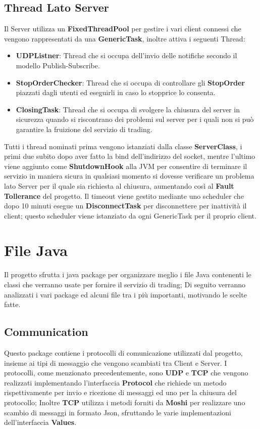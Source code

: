 \documentclass{article}
\begin{document}
\subsection{Thread Lato Server}
Il Server utilizza un \textbf{FixedThreadPool} per gestire i vari client connessi che vengono rappresentati da una \textbf{GenericTask}, inoltre attiva i seguenti Thread:
\begin{itemize}
  \item \textbf{UDPListner}: Thread che si occupa dell'invio delle notifiche secondo il modello Publish-Subscribe.
  \item \textbf{StopOrderChecker}: Thread che si occupa di controllare gli \textbf{StopOrder} piazzati dagli utenti ed eseguirli in caso lo stopprice lo consenta.
  \item \textbf{ClosingTask}: Thread che si occupa di svolgere la chiusura del server in sicurezza quando si riscontrano dei problemi sul server per i quali non si può garantire la fruizione del servizio di trading. 
\end{itemize}
Tutti i thread nominati prima vengono istanziati dalla classe \textbf{ServerClass}, i primi due subito dopo aver fatto la bind dell'indirizzo del socket, mentre l'ultimo viene aggiunto come \textbf{ShutdownHook} alla JVM per consentire di terminare il servizio in maniera sicura in qualsiasi momento si dovesse verificare un problema lato Server per il quale sia richiesta al chiusura, aumentando così al \textbf{Fault Tollerance} del progetto. 
Il timeout viene gestito mediante uno scheduler che dopo 10 minuti esegue un \textbf{DisconnectTask} per disconnettere per inattività il client; questo scheduler viene istanziato da ogni GenericTask per il proprio client.
\newpage

\section{File Java}
Il progetto sfrutta i java package per organizzare meglio i file Java contenenti le classi che verranno usate per fornire il servizio di trading; Di seguito verranno analizzati i vari package ed alcuni file tra i più importanti, motivando le scelte fatte.
\subsection{Communication}
Questo package contiene i protocolli di comunicazione utilizzati dal progetto, insieme ai tipi di messaggio che vengono scambiati tra Client e Server.
I protocolli, come menzionato precedentemente, sono \textbf{UDP} e \textbf{TCP} che vengono realizzati implementando l'interfaccia \textbf{Protocol} che richiede un metodo rispettivamente per invio e ricezione di messaggi ed uno per la chiusura del protocollo;
Inoltre \textbf{TCP} utilizza i metodi forniti da \textbf{Moshi} per realizzare uno scambio di messaggi in formato Json, sfruttando le varie implementazioni dell'interfaccia \textbf{Values}.
\end{document}
